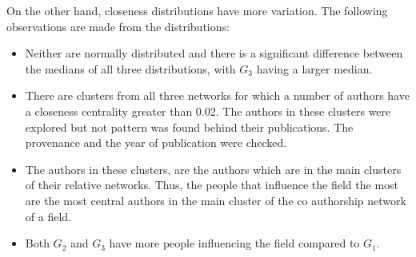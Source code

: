 \documentclass{article}
\theoremstyle{definition}
\begin{document}
On the other hand, closeness distributions have more variation. The following
observations are made from the distributions:

\begin{itemize}
    \item  Neither are normally distributed and there is a significant difference
    between the medians of all three distributions, with \(G_3\) having a larger median.
    \item There are clusters from all three networks for which a number of authors
    have a closeness centrality greater than 0.02. The authors in these clusters
    were explored but not pattern was found behind their publications. The
    provenance and the year of publication were checked.
    \item The authors in these clusters, are the authors which are in the main
    clusters of their relative networks. Thus, the people that influence the
    field the most are the most central authors in the main cluster of the
    co authorship network of a field.
    \item Both \(G_2\) and \(G_3\) have more people influencing the field compared
    to \(G_1\).
\end{itemize}
\end{document}
